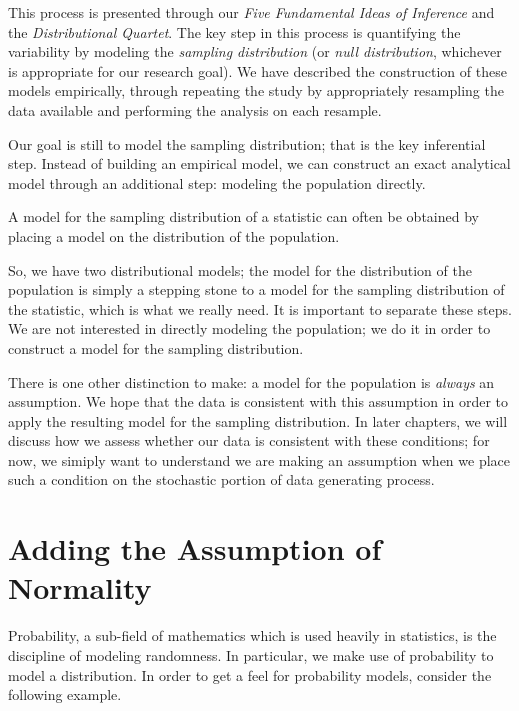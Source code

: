 \documentclass[
]{book}
\theoremstyle{plain}
\theoremstyle{mydefn}
\theoremstyle{myexmpl}
\theoremstyle{remark}
\begin{document}
This process is presented through our \emph{Five Fundamental Ideas of Inference} and the \emph{Distributional Quartet}. The key step in this process is quantifying the variability by modeling the \emph{sampling distribution} (or \emph{null distribution}, whichever is appropriate for our research goal). We have described the construction of these models empirically, through repeating the study by appropriately resampling the data available and performing the analysis on each resample.

Our goal is still to model the sampling distribution; that is the key inferential step. Instead of building an empirical model, we can construct an exact analytical model through an additional step: modeling the population directly.

\begin{rmdkeyidea}
A model for the sampling distribution of a statistic can often be obtained by placing a model on the distribution of the population.
\end{rmdkeyidea}

So, we have two distributional models; the model for the distribution of the population is simply a stepping stone to a model for the sampling distribution of the statistic, which is what we really need. It is important to separate these steps. We are not interested in directly modeling the population; we do it in order to construct a model for the sampling distribution.

There is one other distinction to make: a model for the population is \emph{always} an assumption. We hope that the data is consistent with this assumption in order to apply the resulting model for the sampling distribution. In later chapters, we will discuss how we assess whether our data is consistent with these conditions; for now, we simiply want to understand we are making an assumption when we place such a condition on the stochastic portion of data generating process.

\hypertarget{adding-the-assumption-of-normality}{%
\section{Adding the Assumption of Normality}\label{adding-the-assumption-of-normality}}

Probability, a sub-field of mathematics which is used heavily in statistics, is the discipline of modeling randomness. In particular, we make use of probability to model a distribution. In order to get a feel for probability models, consider the following example.
\end{document}
